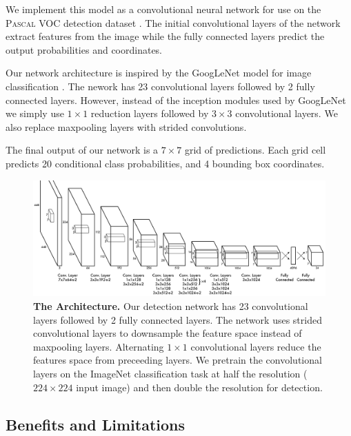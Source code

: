 \documentclass{article} %
\begin{document}
We implement this model as a convolutional neural network for use on the \textsc{Pascal} VOC detection dataset \cite{Everingham15}. The initial convolutional layers of the network extract features from the image while the fully connected layers predict the output probabilities and coordinates.

Our network architecture is inspired by the GoogLeNet model for image classification \cite{DBLP:journals/corr/SzegedyLJSRAEVR14}. The nework has 23 convolutional layers followed by 2 fully connected layers. However, instead of the inception modules used by GoogLeNet we simply use $1 \times 1$ reduction layers followed by $3 \times 3$ convolutional layers. We also replace maxpooling layers with strided convolutions.

The final output of our network is a $7 \times 7$ grid of predictions. Each grid cell predicts 20 conditional class probabilities, and 4 bounding box coordinates.

   \begin{figure}[h]
      \centering
        \includegraphics[width=\linewidth]{detectnet2}
      \caption{\textbf{The Architecture.} Our detection network has 23 convolutional layers followed by 2 fully connected layers. The network uses strided convolutional layers to downsample the feature space instead of maxpooling layers. Alternating $1 \times 1$ convolutional layers reduce the features space from preceeding layers. We pretrain the convolutional layers on the ImageNet classification task at half the resolution ($224 \times 224$ input image) and then double the resolution for detection.}
      \label{net}
   \end{figure}


\subsection{Benefits and Limitations}
\end{document}

